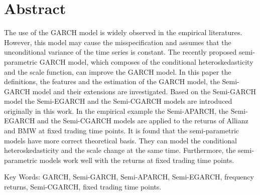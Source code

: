 \chapter*{\centering Abstract}\label{secAbstrct}

The use of the GARCH model is widely observed in the empirical literatures. However, this model may cause the misspecification and assumes that the unconditional variance of the time series is constant. The recently proposed semi-parametric GARCH model, which composes of the conditional heteroskedasticity and the scale function, can improve the GARCH model. In this paper the definitions, the features and the estimation of the GARCH model, the Semi-GARCH model and their extensions are investigated. Based on the Semi-GARCH model the Semi-EGARCH and the Semi-CGARCH models are introduced originally in this work. In the empirical example the Semi-APARCH, the Semi-EGARCH and the Semi-CGARCH models are applied to the returns of Allianz and BMW at fixed trading time points. It is found that the semi-parametric models have more correct theoretical basis. They can model the conditional heteroskedasticity and the scale change at the same time. Furthermore, the semi-parametric models work well with the returns at fixed trading time points.

Key Words: GARCH, Semi-GARCH, Semi-APARCH, Semi-EGARCH, frequency returns, Semi-CGARCH, fixed trading time points.
